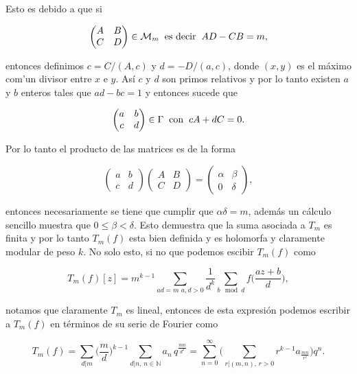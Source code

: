 \documentclass[letterpaper]{article}
\newcommand{\nat}{\ensuremath{ \mathbb N }}
\newcommand{\ga}{\ensuremath{\Gamma}}
\begin{document}
Esto es debido a que si

$$
\begin{pmatrix}
A & B \\
C & D
\end{pmatrix}\in\mathcal{M}_m\hspace{0.2cm}\textrm{es decir}\hspace{0.2cm} AD-CB=m,$$

\noindent entonces definimos  $c=C/(A,c)$ y $d=-D/(a,c)$, donde $(x,y)$ es el máximo com'un divisor entre $x$ e $y$. Así $c$ y $d$ son primos relativos y por lo tanto existen $a$ y $b$ enteros tales que $ad-bc=1$ y entonces sucede que

$$
\begin{pmatrix}
a & b \\
c & d
\end{pmatrix}\in\ga\hspace{0.2cm}\textrm{con}\hspace{0.2cm} cA+dC=0.
$$

Por lo tanto el producto de las matrices es de la forma

$$
\begin{pmatrix}
a & b \\
c & d
\end{pmatrix}\begin{pmatrix}
A & B \\
C & D
\end{pmatrix}=\begin{pmatrix}
\alpha & \beta \\
0 & \delta
\end{pmatrix},
$$

\noindent entonces necesariamente se tiene que cumplir que $\alpha\delta=m$, además un cálculo sencillo muestra que $0\leq\beta<\delta$. Esto demuestra que la suma asociada a $T_m$ es finita y por lo tanto $T_m(f)$ esta bien definida y es holomorfa y claramente modular de peso $k$. No solo esto, si no que podemos escibir $T_m(f)$ como

\begin{equation}
T_m(f)[z]=m^{k-1}\sum_{ad=m\,\, a,d>0}\frac{1}{d^k}\sum_{b \mod d}f\Big(\frac{az+b}{d}\Big),
\end{equation}

\noindent notamos que claramente $T_m$ es lineal, entonces de esta expresión podemos escribir a $T_m(f)$ en términos de su serie de Fourier como

\begin{equation}
T_m(f)=\sum_{d\vert m}\Big(\frac{m}{d}\Big)^{k-1}\sum_{d\vert n,\,n\in\nat}a_n\,q^{\frac{mn}{d^2}}
=\sum_{n=0}^{\infty}\Big(\sum_{r\vert(m,n),\,r>0}r^{k-1}a_{\frac{mn}{r^2}}\Big)q^n.
\end{equation}
\end{document}
